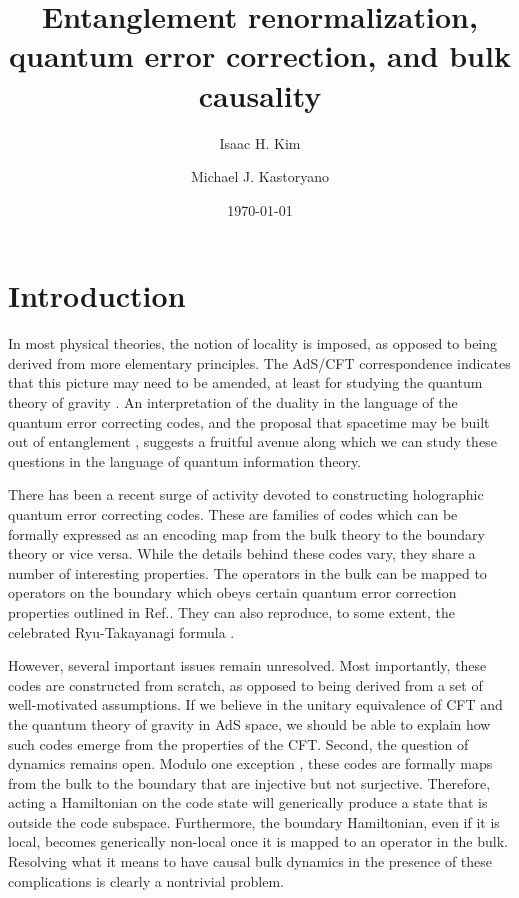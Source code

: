 \documentclass[a4paper,11pt]{article}
\title{Entanglement renormalization, quantum error correction, and bulk causality}
\author[a]{Isaac H. Kim}
\affiliation[a]{IBM T. J. Watson Research Center, Yorktown Heights, New York, USA}
\author[b]{Michael J. Kastoryano}
\affiliation[b]{NBIA, Niels Bohr Institute, University of Copenhagen, Denmark}
\date{\today}
\newcommand{\1}{\mathbbm{1}}
\begin{document}
      \maketitle
\flushbottom


\section{Introduction}
In most physical theories, the notion of locality is imposed, as opposed to being derived from more elementary principles. The AdS/CFT correspondence
indicates that this picture may need to be amended, at least for studying the quantum theory of gravity \cite{Maldacena1997,Witten1998,Aharony1999}. An interpretation
of the duality in the language of the quantum error correcting codes\cite{Almheiri2014}, and the proposal that spacetime may be built out of entanglement \cite{Raamsdonk2010}, suggests
a fruitful avenue along which we can study these questions in the language of quantum information theory.


There has been a recent surge of activity devoted to constructing holographic quantum error correcting codes\cite{Pastawski2015,Yang2015,Hayden2016,Donnelly2016}. These are families of codes which can be formally
expressed as an encoding map from the bulk theory to the boundary theory or vice versa. While the details behind these codes vary, they share
 a number of interesting properties. The operators in the bulk can be mapped to operators on the boundary which obeys certain quantum error correction
 properties outlined in Ref.\cite{Almheiri2014}. They can also reproduce, to some extent, the celebrated Ryu-Takayanagi formula \cite{Ryu2006}.

However, several important issues remain unresolved. Most importantly, these codes are constructed from scratch, as opposed to being derived from a set of well-motivated
assumptions. If we believe in the unitary equivalence of CFT and the quantum theory of gravity in AdS space, we should be able to explain how such codes
emerge from the properties of the CFT. Second, the question of dynamics remains open. Modulo one exception \cite{Yang2015}, these codes are formally maps from the bulk to the boundary that
are injective but not surjective. Therefore, acting a Hamiltonian on the code state will generically produce a state that is outside the code subspace. Furthermore, the boundary Hamiltonian, even if it is local, becomes generically non-local once it is mapped to an operator in the bulk. Resolving
what it means to have  causal bulk dynamics in the presence of these complications is clearly a nontrivial problem.
\end{document}
